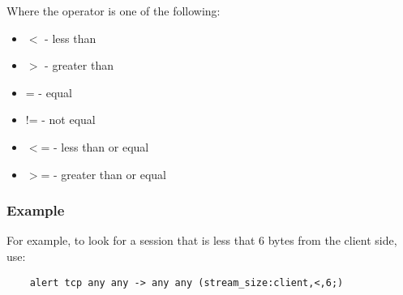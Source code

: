 \documentclass[english]{report}
\begin{document}
Where the operator is one of the following:

\begin{itemize}
\item $<$ - less than
\item $>$ - greater than
\item = - equal
\item != - not equal
\item $<$= - less than or equal
\item $>$= - greater than or equal
\end{itemize}

\subsubsection{Example}

For example, to look for a session that is less that 6 bytes from the client
side, use:

\begin{verbatim}
    alert tcp any any -> any any (stream_size:client,<,6;)
\end{verbatim}
\end{document}
